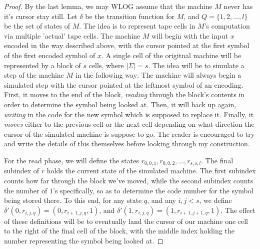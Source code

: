 \documentclass{article}
\theoremstyle{definition}
\theoremstyle{plain}
\theoremstyle{theorem}
\begin{document}
\begin{proof}
	By the last lemma, we may WLOG assume that the machine $M$ never has it's cursor stay still. Let $\delta$ be the transition function for $M$, and $Q = \{1,2,...,l\}$ be the set of states of $M$. The idea is to represent tape cells in $M$'s computation via multiple 'actual' tape cells. 
	The machine $M$ will begin with the input $x$ encoded in the way described above, with the cursor pointed at the first symbol of the first encoded symbol of $x$. A single cell of the origitnal machine will be represented by a block of $s$ cells, where $|\Sigma| = s$. The idea will be to simulate a step of the machine $M$ in the following way: The machine will always begin a simulated step with the cursor pointed at the leftmost symbol of an encoding. First, it moves to the end of the block, \textit{reading} through the block's contents in order to determine the symbol being looked at. Then, it will back up again, \textit{writing} in the code for the new symbol which is supposed to replace it. Finally, it \textit{moves} either to the previous cell or the next cell depending on what direction the cursor of the simulated machine is suppose to go. The reader is encouraged to try and write the details of this themselves before looking through my construction. \par 
	For the read phase, we will define the states $r_{0,0,1},r_{0,0,2},...,r_{s,s,l}$. The final subindex of $r$ holds the current state of the simulated machine. The first subindex counts how far through the block we've moved, while the second subindex counts the number of $1$'s specifically, so as to determine the code number for the symbol being stored there. To this end, for any state $q$, and any $i,j <s$,  we define $\delta'(0,r_{i,j,q}) = (0,r_{i+1,j,q},1)$, and $\delta'(1,r_{i,j,q}) = (1,r_{i+1,j+1,q},1)$. The effect of these definitions will be to eventually land the cursor of our machine one cell to the right of the final cell of the block, with the middle index holding the number representing the symbol being looked at. \par 

\end{proof}
\end{document}
